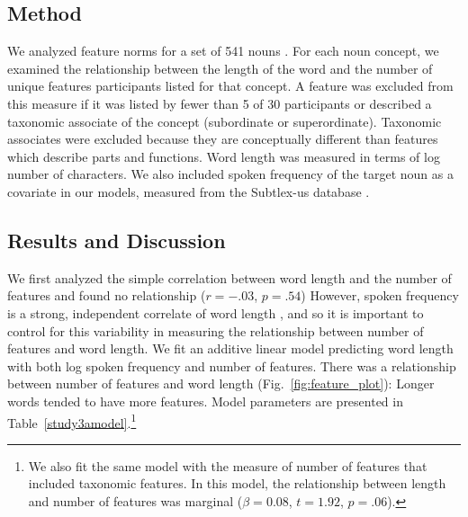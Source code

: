 \subsection{Method}
We analyzed feature norms for a set of 541 nouns \cite{mcrae2005semantic}. For each noun concept, we examined the relationship between the length of the word and the number of unique features participants listed for that concept. A feature was excluded from this measure if it was listed by fewer than 5 of 30 participants or described a taxonomic associate of the concept (subordinate or superordinate). Taxonomic associates were excluded because they are conceptually different than features which describe parts and functions. Word length was measured in terms of log number of characters. We also included spoken frequency of the target noun as a covariate in our models, measured from the Subtlex-us database \cite{brysbaert2009moving}. 

\subsection{Results and Discussion}
We first analyzed the simple correlation between word length and the number of features and found no relationship ($r=-.03$, $p=.54$)  However, spoken frequency is a strong, independent correlate of word length \cite{zipf1936}, and so it is important to control for this variability in measuring the relationship between number of features and word length. We fit an additive linear model predicting word length with both log spoken frequency and number of features.  There was a  relationship between number of features and word length (Fig.\ \ref{fig:feature_plot}): Longer words tended to have more features. Model parameters are presented in Table~\ref{study3amodel}.\footnote{We also fit the same model with the measure of number of features that included taxonomic features. In this model, the relationship between length and number of features was marginal ($\beta=0.08$, $t =1.92$, $p=.06$).} 

